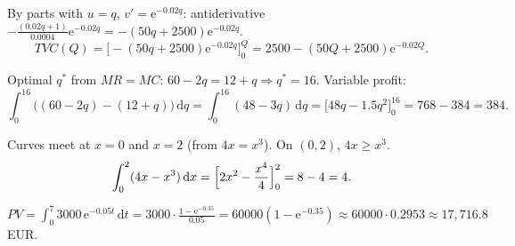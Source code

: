 \begin{solutions}
  \item By parts with $u=q$, $v'=\mathrm{e}^{-0.02q}$: antiderivative
        $-\frac{(0.02q+1)}{0.0004}\mathrm{e}^{-0.02q}
        =-(50q+2500)\mathrm{e}^{-0.02q}$.
        \[
          TVC(Q)=\bigl[-(50q+2500)\mathrm{e}^{-0.02q}\bigr]_{0}^{Q}
            =2500-(50Q+2500)\mathrm{e}^{-0.02Q} .
        \]

  \item Optimal $q^{*}$ from $MR=MC$: $60-2q=12+q\Rightarrow q^{*}=16$.
        Variable profit:
        \[
          \int_{0}^{16} \bigl((60-2q)-(12+q)\bigr)\,\mathrm{d}q
            =\int_{0}^{16} (48-3q)\,\mathrm{d}q
            =\bigl[48q-1.5q^{2}\bigr]_{0}^{16}=768-384=384 .
        \]

  \item Curves meet at $x=0$ and $x=2$ (from $4x=x^{3}$). On $(0,2)$,
        $4x\ge x^{3}$.
        \[
          \int_{0}^{2} (4x-x^{3})\,\mathrm{d}x
            =\Bigl[2x^{2}-\frac{x^{4}}{4}\Bigr]_{0}^{2}=8-4=4 .
        \]

  \item $\displaystyle PV=\int_{0}^{7} 3000\,\mathrm{e}^{-0.05t}\,\mathrm{d}t
        =3000\cdot\frac{1-\mathrm{e}^{-0.35}}{0.05}=60000(1-\mathrm{e}^{-0.35})
        \approx 60000\cdot 0.2953\approx 17{,}716.8$ EUR.
\end{solutions}
